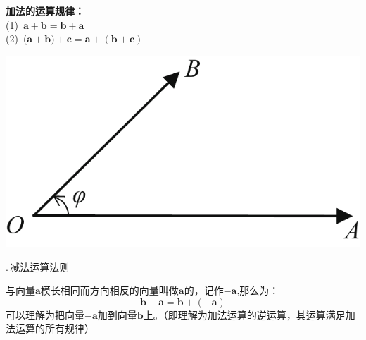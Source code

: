 \begin{minipage}{0.5\linewidth}
\noindent \textbf{加法的运算规律：}\\
(1)$\,$  \qquad $\boldsymbol{a}+\boldsymbol{b}=\boldsymbol{b}+\boldsymbol{a} $\\
(2)$\,$  \qquad ($\boldsymbol{a}+\boldsymbol{b})+\boldsymbol{c}=\boldsymbol{a}+(\boldsymbol{b}+\boldsymbol{c}) $\\
\end{minipage}
\begin{minipage}{0.5\linewidth}
	\centering
	\includegraphics[width = 0.5\linewidth]{pic/C-5/vecang}
	\vspace*{-1em}
	\label{向量的加法运算规律}
\end{minipage}

.$\,$减法运算法则\\
\vspace*{-1em}\vspace*{-1em}

与向量$\boldsymbol{a}$模长相同而方向相反的向量叫做$\boldsymbol{a}$的，记作$-\boldsymbol{a}$,那么为：
\begin{equation}
	\boldsymbol{b}-\boldsymbol{a}=\boldsymbol{b}+(-\boldsymbol{a})
\end{equation}
可以理解为把向量$-\boldsymbol{a}$加到向量$\boldsymbol{b}$上。（即理解为加法运算的逆运算，其运算满足加法运算的所有规律）

